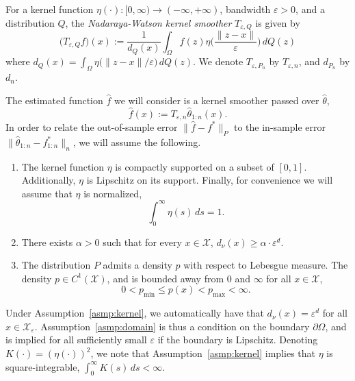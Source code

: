 \documentclass{article}
\newcommand{\1}{\mathbf{1}}
\newcommand{\mc}[1]{\mathcal{#1}}
\newcommand{\wh}[1]{\widehat{#1}}
\theoremstyle{definition}
\theoremstyle{remark}
\begin{document}
For a kernel function $\eta(\cdot): [0,\infty) \to (-\infty,+\infty)$, bandwidth $\varepsilon > 0$, and a distribution $Q$, the \emph{Nadaraya-Watson kernel smoother} $T_{\varepsilon,Q}$ is given by
\begin{equation*}
\bigl(T_{\varepsilon,Q}f)(x) := \frac{1}{d_Q(x)} \int_{\Omega} f(z)\eta\biggl(\frac{\|z - x\|}{\varepsilon}\biggr) \,dQ(z)
\end{equation*}
where $d_Q(x) = \int_{\Omega} \eta\bigl(\|z - x\|/\varepsilon\bigr) \,dQ(z)$. We denote $T_{\varepsilon,P_n}$ by $T_{\varepsilon,n}$, and $d_{P_n}$ by $d_n$.

The estimated function $\wh{f}$ we will consider is a kernel smoother passed over $\wh{\theta}$,
\begin{equation}
\label{eqn:kernel_smoother_laplacian_eigenmaps}
\wh{f}(x) := T_{\varepsilon,n}\wh{\theta}_{1:n}(x).
\end{equation}
In order to relate the out-of-sample error $\|\wh{f} - f^{\ast}\|_P$ to the in-sample error $\|\wh{\theta}_{1:n} - f^{\ast}_{1:n}\|_n$, we will assume the following.
\begin{enumerate}[label=(A\arabic*)]
	\item
	\label{asmp:kernel}
	The kernel function $\eta$ is compactly supported on a subset of $[0,1]$. Additionally, $\eta$ is Lipschitz on its support. Finally, for convenience we will assume that $\eta$ is normalized, 
	\begin{equation*}
	\int_{0}^{\infty} \eta(s) \,ds = 1.
	\end{equation*}
	\item 
	\label{asmp:domain} There exists $\alpha > 0$ such that for every $x \in \mc{X}$, $d_{\nu}(x) \geq \alpha \cdot \varepsilon^d$.
	\item 
	\label{asmp:density}The distribution $P$ admits a density $p$ with respect to Lebesgue measure. The density $p \in C^1(\mc{X})$, and is bounded away from $0$ and $\infty$ for all $x \in \mc{X}$,
	\begin{equation*}
	0 < p_{\min} \leq p(x) < p_{\max} < \infty.
	\end{equation*}
\end{enumerate}
Under Assumption~\ref{asmp:kernel}, we automatically have that $d_\nu(x) = \varepsilon^d$ for all $x \in \mc{X}_{\varepsilon}$. Assumption~\ref{asmp:domain} is thus a condition on the boundary $\partial \Omega$, and is implied for all sufficiently small $\varepsilon$ if the boundary is Lipschitz. Denoting $K(\cdot) = (\eta(\cdot))^2$, we note that Assumption~\ref{asmp:kernel} implies that $\eta$ is square-integrable, $\int_{0}^{\infty} K(s) \,ds < \infty$.
\end{document}
